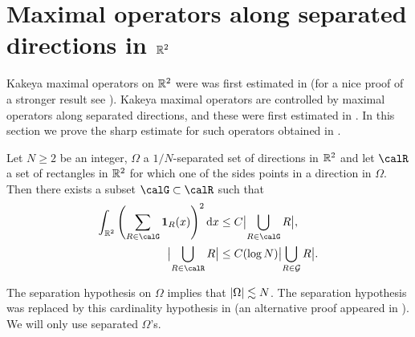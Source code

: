 \section{Maximal operators along separated directions in $\mathbb{R}^{2}$}
Kakeya maximal operators on $\mathbb{R}^{2}$ were was first estimated in \cite{MR0447949} (for a nice proof of a stronger result see \cite{MR2550196}).
Kakeya maximal operators are controlled by maximal operators along separated directions, and these were first estimated in \cite{MR0438022}.
In this section we prove the sharp estimate for such operators obtained in \cite{MR0481883}.

\begin{lemma}
\label{lem:Stromberg-covering}
Let $N\geq 2$ be an integer, $\Omega$ a $1/N$-separated set of directions in $\mathbb{R}^{2}$ and let $\calR$ a set of rectangles in $\mathbb{R}^{2}$ for which one of the sides points in a direction in $\Omega$.
Then there exists a subset $\calG \subset \calR$ such that
\begin{align}
\label{eq:int-sum^2}
\int_{\R^{2}} \left(\sum_{R \in \calG} \one_{R}(x)\right)^{2} \dif x
&\leq C \abs[\big]{ \bigcup_{R\in\calG} R }, \\
\label{eq:cover}
\abs[\big]{ \bigcup_{R \in \calR} R }
&\leq C (\log N) \abs[\big]{ \bigcup_{R \in \cal G} R }.
\end{align}
\end{lemma}
The separation hypothesis on $\Omega$ implies that $\lvert\Omega\rvert \lesssim N$.
The separation hypothesis was replaced by this cardinality hypothesis in \cite{MR1681088} (an alternative proof appeared in \cite{MR1979927}).
We will only use separated $\Omega$'s.
